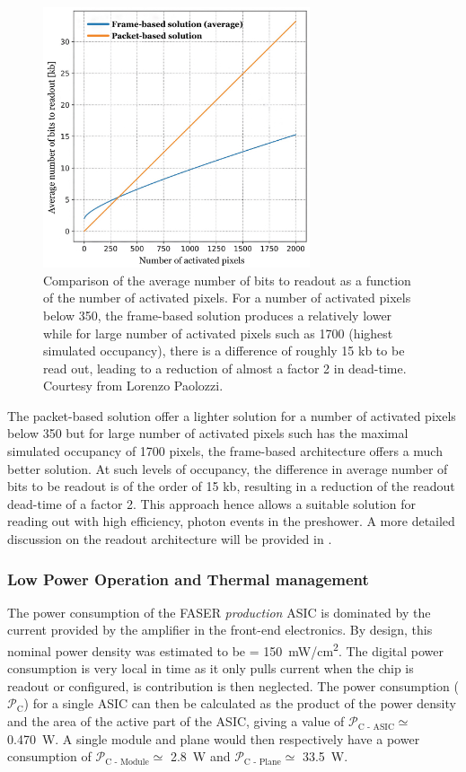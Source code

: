 		\begin{figure}[h]
			\centering
			\includegraphics[width=0.7\textwidth]{files/readout_data_size}
			\caption{Comparison of the average number of bits to readout as a function of the number of activated pixels. For a number of activated pixels below 350, the frame-based solution produces a relatively lower while for large number of activated pixels such as 1700 (highest simulated occupancy), there is a difference of roughly 15 kb to be read out, leading to a reduction of almost a factor 2 in dead-time. Courtesy from Lorenzo Paolozzi.}
			\label{im:readout_data_size}
		\end{figure}
		
		The packet-based solution offer a lighter solution for a number of activated pixels below 350 but for large number of activated pixels such has the maximal simulated occupancy of 1700 pixels, the frame-based architecture offers a much better solution. At such levels of occupancy, the difference in average number of bits to be readout is of the order of 15 kb, resulting in a reduction of the readout dead-time of a factor 2. This approach hence allows a suitable solution for reading out with high efficiency, photon events in the preshower. A more detailed discussion on the readout architecture will be provided in .
		
		\subsubsection{Low Power Operation and Thermal management}
		The power consumption of the FASER \textit{production} ASIC is dominated by the current provided by the amplifier in the front-end electronics. By design, this nominal power density was estimated to be \power = \SI{150}{\milli\watt/\centi\meter\squared}. The digital power consumption is very local in time as it only pulls current when the chip is readout or configured, is contribution is then neglected. The power consumption ($\mathcal{P}_{\text{C}}$) for a single ASIC can then be calculated as the product of the power density and the area of the active part of the ASIC, giving a value of $\mathcal{P}_{\text{C - ASIC}} \simeq $ \SI{0.470}{\watt}. A single module and plane would then respectively have a power consumption of $\mathcal{P}_{\text{C - Module}} \simeq $ \SI{2.8}{\watt} and $\mathcal{P}_{\text{C - Plane}} \simeq $ \SI{33.5}{\watt}.
		
